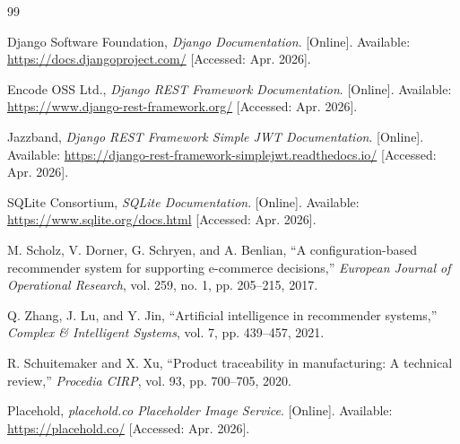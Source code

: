 \documentclass[12pt,letterpaper,oneside,openany]{book}
\begin{document}
\begin{thebibliography}{99}

Django Software Foundation,
\emph{Django Documentation}.
[Online]. Available: \url{https://docs.djangoproject.com/}
[Accessed: Apr. 2026].

Encode OSS Ltd.,
\emph{Django REST Framework Documentation}.
[Online]. Available: \url{https://www.django-rest-framework.org/}
[Accessed: Apr. 2026].

Jazzband,
\emph{Django REST Framework Simple JWT Documentation}.
[Online]. Available: \url{https://django-rest-framework-simplejwt.readthedocs.io/}
[Accessed: Apr. 2026].

SQLite Consortium,
\emph{SQLite Documentation}.
[Online]. Available: \url{https://www.sqlite.org/docs.html}
[Accessed: Apr. 2026].

M. Scholz, V. Dorner, G. Schryen, and A. Benlian,
``A configuration-based recommender system for supporting e-commerce
decisions,''
\emph{European Journal of Operational Research},
vol. 259, no. 1, pp. 205--215, 2017.

Q. Zhang, J. Lu, and Y. Jin,
``Artificial intelligence in recommender systems,''
\emph{Complex \& Intelligent Systems},
vol. 7, pp. 439--457, 2021.

R. Schuitemaker and X. Xu,
``Product traceability in manufacturing: A technical review,''
\emph{Procedia CIRP},
vol. 93, pp. 700--705, 2020.

Placehold,
\emph{placehold.co Placeholder Image Service}.
[Online]. Available: \url{https://placehold.co/}
[Accessed: Apr. 2026].

\end{thebibliography}
\end{document}
